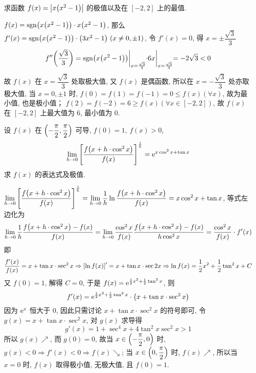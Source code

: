 \begin{example}
    求函数 $f(x)=\qty|x\qty(x^2-1)|$ 的极值以及在 $[-2,2]$ 上的最值.
\end{example}
\begin{solution}
    $f(x)=\mathrm{sgn}\qty(x\qty(x^2-1))\cdot x\qty(x^2-1)$, 那么 $f'(x)=\mathrm{sgn}\qty(x\qty(x^2-1))\cdot\qty(3x^2-1)~ (x\neq0,\pm1)$, 令 $f'(x)=0$, 得
    $x=\pm\dfrac{\sqrt{3}}{3}$
    $$f''\qty(\dfrac{\sqrt{3}}{3})=\mathrm{sgn}\qty(x\qty(x^2-1))\biggl |_{x=\frac{\sqrt{3}}{3}}\cdot 6x\biggl |_{x=\frac{\sqrt{3}}{3}}=-2\sqrt{3}<0$$
    故 $f(x)$ 在 $x=\dfrac{\sqrt{3}}{3}$ 处取极大值, 又 $f(x)$ 是偶函数, 所以在 $x=-\dfrac{\sqrt{3}}{3}$ 处亦取极大值, 
    当 $x=0,\pm1$ 时, $f(0)=f(1)=f(-1)=0\leqslant f(x)(\forall x)$, 故为最小值, 也是极小值；
    $f(2)=f(-2)=6\geqslant f(x)(\forall x\in[-2,2])$, 故 $f(x)$ 在 $[-2,2]$ 上最大值为 6, 最小值为 0.
\end{solution}

\begin{example}
    设 $f(x)$ 在 $\qty(-\dfrac{\pi}{2},\dfrac{\pi}{2})$ 可导, $f(0)=1,~f(x)>0$, $$\displaystyle\lim_{h\to0}\qty[\dfrac{f\qty(x+h\cdot \cos^2x)}{f(x)}]^{\frac{1}{h}}=\mathrm{e}^{x\cos^2x+\tan x}$$
    求 $f(x)$ 的表达式及极值.
\end{example}
\begin{solution}
    $\displaystyle\lim_{h\to0}\qty[\dfrac{f\qty(x+h\cdot \cos^2x)}{f(x)}]^{\frac{1}{h}}=\lim_{h\to0}\dfrac{1}{h}\ln\dfrac{f\qty(x+h\cdot\cos^2x)}{f(x)}=x\cos^2x+\tan x$, 
    等式左边化为 $$\lim_{h\to0}\dfrac{1}{h}\dfrac{f\qty(x+h\cdot\cos^2x)-f(x)}{f(x)}=\lim_{h\to0}\dfrac{\cos^2x}{f(x)}\dfrac{f\qty(x+h\cdot\cos^2x)-f(x)}{h\cos^2x}=\dfrac{\cos^2x}{f(x)}\cdot f'(x)$$
    即 $$\dfrac{f'(x)}{f(x)}=x+\tan x\cdot\sec^2x\Rightarrow \qty[\ln f(x)]'=x+\tan x\cdot\sec2x\Rightarrow \ln f(x)=\dfrac{1}{2}x^2+\dfrac{1}{2}\tan^2x+C$$
    又 $f(0)=1$, 解得 $C=0$, 于是
    $f(x)=\mathrm{e}^{\frac{1}{2}x^2+\frac{1}{2}\tan^2x}$, 则
    $$f'(x)=\mathrm{e}^{\frac{1}{2}x^2+\frac{1}{2}\tan^2x}\cdot\qty(x+\tan x\cdot\sec^2x)$$
    因为 $\mathrm{e}^{x}$ 恒大于 0, 因此只需讨论 $x+\tan x\cdot\sec^2x$ 的符号即可, 令 $g(x)=x+\tan x\cdot\sec^2x$, 对 $g(x)$ 求导得 $$g'(x)=1+\sec^4x+4\tan^2x\sec^2x>1$$
    所以 $g(x)\nearrow$, 而 $g(0)=0$, 故当 $x\in\qty(-\dfrac{\pi}{2},0)$ 时, $g(x)<0\Rightarrow f'(x)<0\Rightarrow f(x)\searrow$; 当 $x\in\qty(0,\dfrac{\pi}{2})$ 时, $f(x)\nearrow$, 
    所以当 $x=0$ 时, $f(x)$ 取得极小值, 无极大值, 且 $f(0)=1.$
\end{solution}

